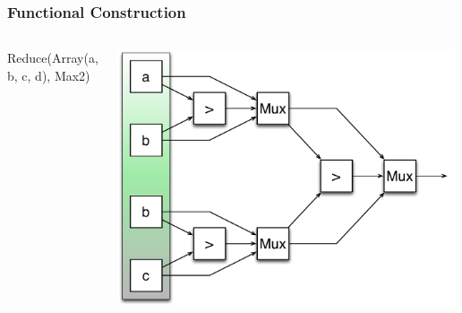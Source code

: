 \documentclass[xcolor=pdflatex,dvipsnames,table]{beamer}
\begin{document}
\begin{frame}[fragile]
\frametitle{Functional Construction}

\begin{columns}


\begin{scala}
Reduce(Array(a, b, c, d), Max2)
\end{scala}


\begin{center}
\includegraphics[width=0.99\textwidth]{figs/reduceMax.pdf} \\
\end{center}

\end{columns}

\end{frame}
\end{document}
